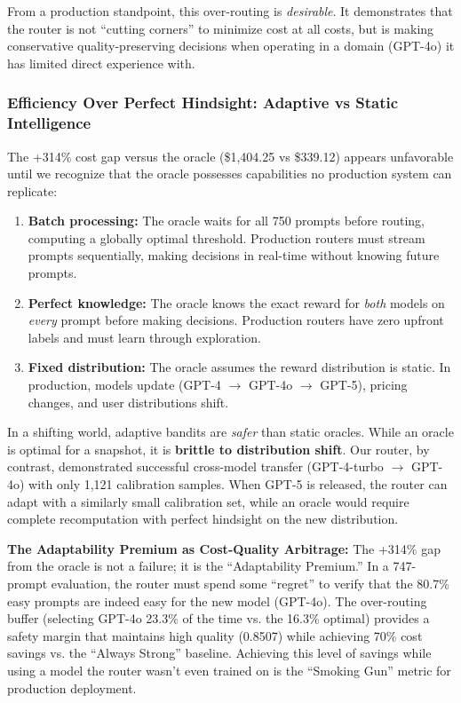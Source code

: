 From a production standpoint, this over-routing is \emph{desirable}. It demonstrates that the router is not ``cutting corners'' to minimize cost at all costs, but is making conservative quality-preserving decisions when operating in a domain (GPT-4o) it has limited direct experience with.

\subsubsection{Efficiency Over Perfect Hindsight: Adaptive vs Static Intelligence}

The +314\% cost gap versus the oracle (\$1,404.25 vs \$339.12) appears unfavorable until we recognize that the oracle possesses capabilities no production system can replicate:
\begin{enumerate}
    \item \textbf{Batch processing:} The oracle waits for all 750 prompts before routing, computing a globally optimal threshold. Production routers must stream prompts sequentially, making decisions in real-time without knowing future prompts.
    
    \item \textbf{Perfect knowledge:} The oracle knows the exact reward for \emph{both} models on \emph{every} prompt before making decisions. Production routers have zero upfront labels and must learn through exploration.
    
    \item \textbf{Fixed distribution:} The oracle assumes the reward distribution is static. In production, models update (GPT-4 $\to$ GPT-4o $\to$ GPT-5), pricing changes, and user distributions shift.
\end{enumerate}

In a shifting world, adaptive bandits are \emph{safer} than static oracles. While an oracle is optimal for a snapshot, it is \textbf{brittle to distribution shift}. Our router, by contrast, demonstrated successful cross-model transfer (GPT-4-turbo $\to$ GPT-4o) with only 1,121 calibration samples. When GPT-5 is released, the router can adapt with a similarly small calibration set, while an oracle would require complete recomputation with perfect hindsight on the new distribution.

\textbf{The Adaptability Premium as Cost-Quality Arbitrage:} The +314\% gap from the oracle is not a failure; it is the ``Adaptability Premium.'' In a 747-prompt evaluation, the router must spend some ``regret'' to verify that the 80.7\% easy prompts are indeed easy for the new model (GPT-4o). The over-routing buffer (selecting GPT-4o 23.3\% of the time vs. the 16.3\% optimal) provides a safety margin that maintains high quality (0.8507) while achieving 70\% cost savings vs. the ``Always Strong'' baseline. Achieving this level of savings while using a model the router wasn't even trained on is the ``Smoking Gun'' metric for production deployment.

